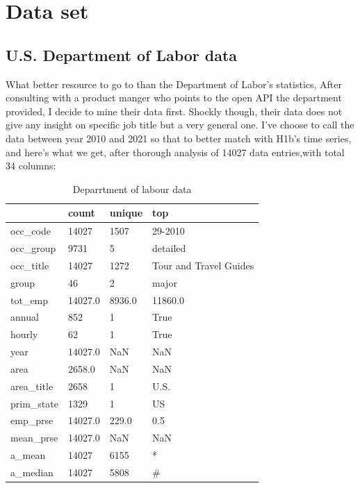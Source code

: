 \section{Data set}
\subsection{U.S. Department of Labor data}
What better resource to go to than the Department of Labor's statistics, After consulting with a product manger who points to the open API the department provided, I decide to mine their data first.  Shockly though, their data does not give any insight on specific job title but a very general one. I've choose to call the data between year 2010 and 2021 so that to better match with H1b's time series, and here's what we get, after thorough analysis  of 14027 data entries,with total 34 columns:\\
\begin{table}[h!]
	\caption{Deparrtment of  labour data }
	\resizebox{\columnwidth}{!}
	{%
		
		\begin{tabular}{llll}
			\hline
			{} &    count &  unique &                     top \\
			\hline
			occ\_code   &    14027 &    1507 &                 29-2010 \\
			occ\_group  &     9731 &       5 &                detailed \\
			occ\_title  &    14027 &    1272 &  Tour and Travel Guides \\
			group      &       46 &       2 &                   major \\
			tot\_emp    &  14027.0 &  8936.0 &                 11860.0 \\
			annual     &      852 &       1 &                    True \\
			hourly     &       62 &       1 &                    True \\
			year       &  14027.0 &     NaN &                     NaN \\
			area       &   2658.0 &     NaN &                     NaN \\
			area\_title &     2658 &       1 &                    U.S. \\
			prim\_state &     1329 &       1 &                      US \\
			emp\_prse   &  14027.0 &   229.0 &                     0.5 \\
			mean\_prse  &  14027.0 &     NaN &                     NaN \\
			a\_mean     &    14027 &    6155 &                       * \\
			a\_median   &    14027 &    5808 &                       \# \\
			\hline
		\end{tabular}
		
	}
\end{table}


